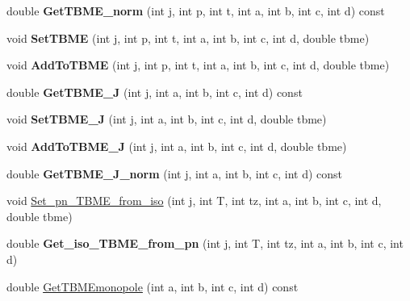 \begin{DoxyCompactItemize}
\item 
\mbox{\label{classTwoBodyME_af7a447f398390e3f536a22fcece3b677}} 
double {\bfseries Get\+T\+B\+M\+E\+\_\+norm} (int j, int p, int t, int a, int b, int c, int d) const
\item 
\mbox{\label{classTwoBodyME_a5e7801ffab553d88ff8e2ef6e706e013}} 
void {\bfseries Set\+T\+B\+ME} (int j, int p, int t, int a, int b, int c, int d, double tbme)
\item 
\mbox{\label{classTwoBodyME_a0c87a5d98d044af0cd9995653264b5a9}} 
void {\bfseries Add\+To\+T\+B\+ME} (int j, int p, int t, int a, int b, int c, int d, double tbme)
\item 
\mbox{\label{classTwoBodyME_aa2da878a0a9a14d9e37ebc2e8bfcfb3a}} 
double {\bfseries Get\+T\+B\+M\+E\+\_\+J} (int j, int a, int b, int c, int d) const
\item 
\mbox{\label{classTwoBodyME_a796ab8b1112f1acc7eb5d6b886fa9865}} 
void {\bfseries Set\+T\+B\+M\+E\+\_\+J} (int j, int a, int b, int c, int d, double tbme)
\item 
\mbox{\label{classTwoBodyME_ad2fed429571805bd4d8aa07a5d3903f1}} 
void {\bfseries Add\+To\+T\+B\+M\+E\+\_\+J} (int j, int a, int b, int c, int d, double tbme)
\item 
\mbox{\label{classTwoBodyME_a2e9eb9c3f053e26e88fe8cda70ed0a21}} 
double {\bfseries Get\+T\+B\+M\+E\+\_\+\+J\+\_\+norm} (int j, int a, int b, int c, int d) const
\item 
void \hyperlink{classTwoBodyME_adc76bb65d2b3bc2006a70fb2a61464c9}{Set\+\_\+pn\+\_\+\+T\+B\+M\+E\+\_\+from\+\_\+iso} (int j, int T, int tz, int a, int b, int c, int d, double tbme)
\item 
\mbox{\label{classTwoBodyME_a98aa9dc5ab0e1d66be59e4266e4000d2}} 
double {\bfseries Get\+\_\+iso\+\_\+\+T\+B\+M\+E\+\_\+from\+\_\+pn} (int j, int T, int tz, int a, int b, int c, int d)
\item 
double \hyperlink{classTwoBodyME_a41e1d7a520f31b57283b7817a35bceb7}{Get\+T\+B\+M\+Emonopole} (int a, int b, int c, int d) const
\item 

\end{DoxyCompactItemize}
